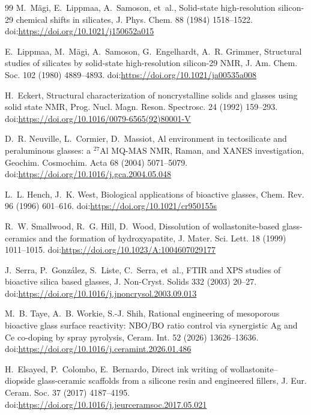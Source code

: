 \documentclass[11pt]{article}
\begin{document}
\begin{thebibliography}{99}
M.~M\"agi, E.~Lippmaa, A.~Samoson, et~al., Solid-state high-resolution silicon-29 chemical shifts in silicates, J. Phys. Chem. 88 (1984) 1518--1522.
\newblock doi:\url{https://doi.org/10.1021/j150652a015}


E.~Lippmaa, M.~M\"agi, A.~Samoson, G.~Engelhardt, A.~R. Grimmer, Structural studies of silicates by solid-state high-resolution silicon-29 NMR, J. Am. Chem. Soc. 102 (1980) 4889--4893.
\newblock doi:\url{https://doi.org/10.1021/ja00535a008}


H.~Eckert, Structural characterization of noncrystalline solids and glasses using solid state NMR, Prog. Nucl. Magn. Reson. Spectrosc. 24 (1992) 159--293.
\newblock doi:\url{https://doi.org/10.1016/0079-6565(92)80001-V}


D.~R. Neuville, L.~Cormier, D.~Massiot, Al environment in tectosilicate and peraluminous glasses: a $^{27}$Al MQ-MAS NMR, Raman, and XANES investigation, Geochim. Cosmochim. Acta 68 (2004) 5071--5079.
\newblock doi:\url{https://doi.org/10.1016/j.gca.2004.05.048}


L.~L. Hench, J.~K. West, Biological applications of bioactive glasses, Chem. Rev. 96 (1996) 601--616.
\newblock doi:\url{https://doi.org/10.1021/cr950155s}


R.~W. Smallwood, R.~G. Hill, D.~Wood, Dissolution of wollastonite-based glass-ceramics and the formation of hydroxyapatite, J. Mater. Sci. Lett. 18 (1999) 1011--1015.
\newblock doi:\url{https://doi.org/10.1023/A:1004607029177}


J.~Serra, P.~Gonz\'alez, S.~Liste, C.~Serra, et~al., FTIR and XPS studies of bioactive silica based glasses, J. Non-Cryst. Solids 332 (2003) 20--27.
\newblock doi:\url{https://doi.org/10.1016/j.jnoncrysol.2003.09.013}


M.~B. Taye, A.~B. Workie, S.-J. Shih, Rational engineering of mesoporous bioactive glass surface reactivity: NBO/BO ratio control via synergistic Ag and Ce co-doping by spray pyrolysis, Ceram. Int. 52 (2026) 13626--13636.
\newblock doi:\url{https://doi.org/10.1016/j.ceramint.2026.01.486}


H.~Elsayed, P.~Colombo, E.~Bernardo, Direct ink writing of wollastonite--diopside glass-ceramic scaffolds from a silicone resin and engineered fillers, J. Eur. Ceram. Soc. 37 (2017) 4187--4195.
\newblock doi:\url{https://doi.org/10.1016/j.jeurceramsoc.2017.05.021}



\end{thebibliography}
\end{document}
